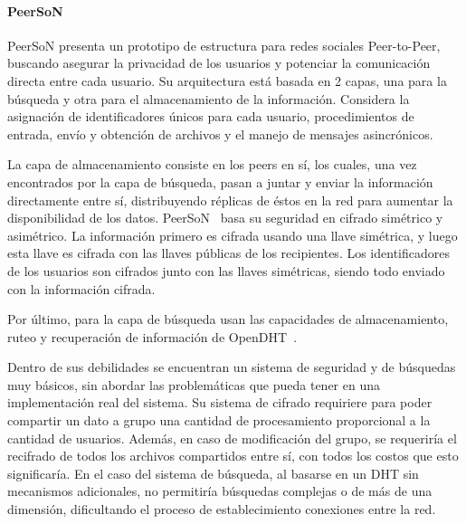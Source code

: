 \paragraph{PeerSoN}
PeerSoN presenta un prototipo de estructura para redes sociales
Peer-to-Peer, buscando asegurar la privacidad de los usuarios y potenciar la
comunicación directa entre cada usuario.
Su arquitectura está basada en 2 capas, una para la búsqueda y otra para el almacenamiento de la
información. Considera la asignación de identificadores únicos para cada
usuario, procedimientos de entrada, envío y obtención de archivos y el manejo
de mensajes asincrónicos.

La capa de almacenamiento consiste en los peers en sí, los cuales, una vez
encontrados por la capa de búsqueda, pasan a juntar y enviar la información
directamente entre sí, distribuyendo réplicas de éstos
en la red para aumentar la disponibilidad de los datos. 
PeerSoN~\cite{buchegger:peerson} basa su seguridad en cifrado simétrico y asimétrico. La
información primero es cifrada usando una llave simétrica, y luego esta
llave es cifrada con las llaves públicas de los recipientes. Los
identificadores de los usuarios son cifrados junto con las llaves
simétricas, siendo todo enviado con la información cifrada.

 Por último, para la capa de búsqueda usan las capacidades de almacenamiento,
ruteo y recuperación de información de
OpenDHT~\cite{Rhea:2005:OPD:1080091.1080102}.

Dentro de sus debilidades se encuentran un sistema de seguridad y de búsquedas
muy básicos, sin abordar las problemáticas que pueda tener en una
implementación real del sistema. Su sistema de cifrado requiriere para poder compartir
un dato a grupo una cantidad de procesamiento proporcional a la
cantidad de usuarios. Además, en caso de modificación del grupo, se requeriría
el recifrado de todos los archivos compartidos entre sí, con todos los
costos que esto significaría. En el caso del sistema de búsqueda, al basarse en
un DHT sin mecanismos adicionales, no permitiría búsquedas complejas o de más
de una dimensión, dificultando el proceso de establecimiento conexiones entre
la red.

